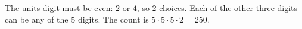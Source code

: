 The units digit must be even: $2$ or $4$, so $2$ choices. Each of the other three digits can be any of the $5$ digits. The count is $5\cdot5\cdot5\cdot2=\boxed{250}$.
